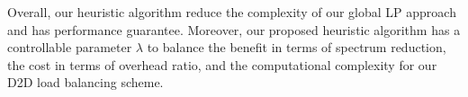 Overall, our heuristic algorithm
reduce the complexity of our global LP approach and has performance guarantee.
Moreover, our proposed heuristic algorithm has a controllable parameter $\lambda$ to
balance the benefit in terms of spectrum reduction, the cost in terms of overhead ratio, and
the computational complexity for our D2D load balancing scheme.
